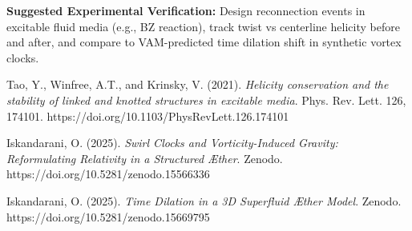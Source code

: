 \documentclass[12pt]{article}
\begin{document}
  \vspace{1em}
  \noindent\textbf{Suggested Experimental Verification:} Design reconnection events in excitable fluid media (e.g., BZ reaction), track twist vs centerline helicity before and after, and compare to VAM-predicted time dilation shift in synthetic vortex clocks.

  
  \begin{thebibliography}{9}
    Tao, Y., Winfree, A.T., and Krinsky, V. (2021). \textit{Helicity conservation and the stability of linked and knotted structures in excitable media}. Phys. Rev. Lett. 126, 174101. https://doi.org/10.1103/PhysRevLett.126.174101

    Iskandarani, O. (2025). \textit{Swirl Clocks and Vorticity-Induced Gravity: Reformulating Relativity in a Structured Æther}. Zenodo. https://doi.org/10.5281/zenodo.15566336

    Iskandarani, O. (2025). \textit{Time Dilation in a 3D Superfluid Æther Model}. Zenodo. https://doi.org/10.5281/zenodo.15669795
  \end{thebibliography}



\ifdefined\standalonechapter
\else
    
    
    
\end{document}
